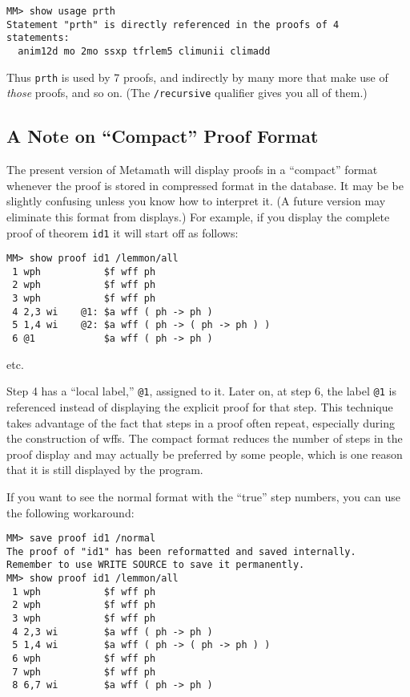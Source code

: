 \begin{verbatim}
MM> show usage prth
Statement "prth" is directly referenced in the proofs of 4
statements:
  anim12d mo 2mo ssxp tfrlem5 climunii climadd
\end{verbatim}

Thus \texttt{prth} is used by 7 proofs, and indirectly by many more that
make use of {\em those} proofs, and so on.  (The \texttt{/recursive}
qualifier gives you all of them.)

\subsection{A Note on ``Compact'' Proof Format}

The present version of Metamath will display proofs in a ``compact''
format whenever the proof is stored in compressed format in the database.  It
may be be slightly confusing unless you know how to interpret it.  (A
future version may eliminate this format from displays.)  For example,
if you display the complete proof of theorem \texttt{id1} it will start
off as follows:

\begin{verbatim}
MM> show proof id1 /lemmon/all
 1 wph           $f wff ph
 2 wph           $f wff ph
 3 wph           $f wff ph
 4 2,3 wi    @1: $a wff ( ph -> ph )
 5 1,4 wi    @2: $a wff ( ph -> ( ph -> ph ) )
 6 @1            $a wff ( ph -> ph )
\end{verbatim}

\begin{center}
{etc.}
\end{center}

Step 4 has a ``local label,'' \texttt{@1}, assigned to it.
Later on, at step 6, the label \texttt{@1} is referenced instead of
displaying the explicit proof for that step.  This technique takes advantage
of the fact that steps in a proof often repeat, especially during the
construction of wffs.  The compact format reduces the number of steps in the
proof display and may actually be preferred by some people, which is one
reason that it is still displayed by the program.

If you want to see the normal format with the ``true'' step numbers, you can
use the following workaround:

\begin{verbatim}
MM> save proof id1 /normal
The proof of "id1" has been reformatted and saved internally.
Remember to use WRITE SOURCE to save it permanently.
MM> show proof id1 /lemmon/all
 1 wph           $f wff ph
 2 wph           $f wff ph
 3 wph           $f wff ph
 4 2,3 wi        $a wff ( ph -> ph )
 5 1,4 wi        $a wff ( ph -> ( ph -> ph ) )
 6 wph           $f wff ph
 7 wph           $f wff ph
 8 6,7 wi        $a wff ( ph -> ph )
\end{verbatim}

